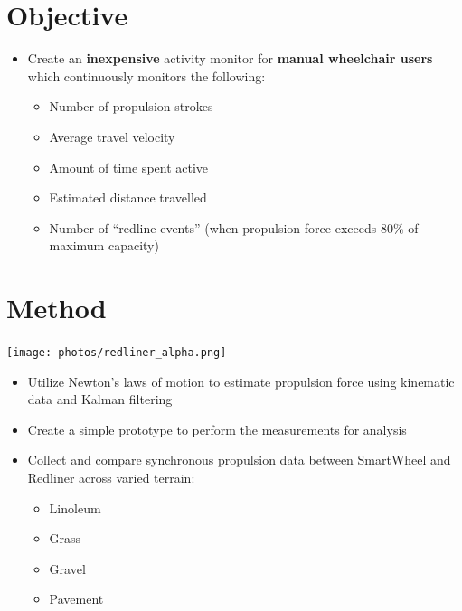 \documentclass[a0,landscape]{a0poster}
\newenvironment{Figure}
  {\par\medskip\noindent\minipage{\linewidth}}
  {\endminipage\par\medskip}
\begin{document}
\begin{multicols*}{3}
\section*{Objective}
\begin{itemize}
    \item Create an \textbf{inexpensive} activity monitor for \textbf{manual wheelchair users} which continuously monitors the following:
    \begin{itemize}
        \item Number of propulsion strokes
        \item Average travel velocity
        \item Amount of time spent active
        \item Estimated distance travelled
        \item Number of ``redline events'' (when propulsion force exceeds 80\% of maximum capacity)
    \end{itemize}
\end{itemize}

\section*{Method}
\begin{minipage}[t]{0.45\columnwidth}
     \begin{Figure}
        \centering
        \texttt{[image: photos/redliner\_alpha.png]}
        \label{fig:redliner:alpha}
    \end{Figure}
\end{minipage}
\begin{minipage}[t]{0.55\columnwidth}
    \begin{itemize}
        \item Utilize Newton's laws of motion to estimate propulsion force using kinematic data and Kalman filtering
        \item Create a simple prototype to perform the measurements for analysis
        \item Collect and compare synchronous propulsion data between SmartWheel and Redliner across varied terrain:
        \begin{itemize}
            \item Linoleum
            \item Grass
            \item Gravel
            \item Pavement
        \end{itemize}
    \end{itemize}
\end{minipage}


\end{multicols*}
\end{document}
